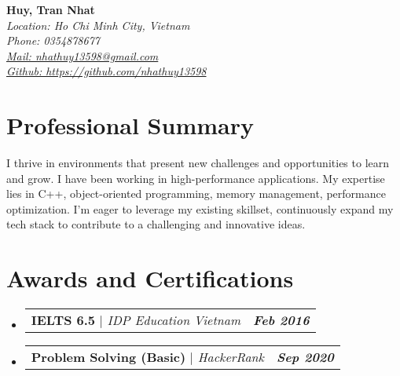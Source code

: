 \documentclass[letterpaper,1pt]{article}
\makeatletter
\newcommand{\sectionspace}{
\vspace{-20pt}
}
\newcommand{\subheadingtitlevspace}{
\vspace{-3pt}
}
\newcommand{\titleItem}[1]{
  \large\textbf{#1}
}
\newcommand{\resumeProjectHeading}[2]{
    \item
    \begin{tabular*}{0.97\textwidth}{l@{\extracolsep{\fill}}r}
      #1 & \textit{\large #2} \\
    \end{tabular*}\vspace{-9pt}
}
\newcommand{\resumeSubHeadingListStart}{\subheadingtitlevspace\begin{itemize}[leftmargin=0.15in, label={}]}
\newcommand{\resumeSubHeadingListEnd}{\end{itemize}}
\makeatother
\begin{document}

\begin{flushleft}
    \textbf{\huge Huy, Tran Nhat} \\    
    \textit{Location: Ho Chi Minh City, Vietnam} \\
    \textit{Phone: 0354878677} \\ 
    \href{mailto:nhathuy13598@gmail.com}{{\textit{Mail: nhathuy13598@gmail.com}}} \\
    \href{https://github.com/nhathuy13598}{{\textit{Github: https://github.com/nhathuy13598}}}
    \vspace{-8pt}
\end{flushleft}



\section{Professional Summary}
\vspace{-3pt}
\begin{itemize}[leftmargin=0.15in, label={}]
    {\item{
     {\large I thrive in environments that present new challenges and opportunities to learn and grow. I have been working in high-performance applications. My expertise lies in C++, object-oriented programming, memory management, performance optimization. I'm eager to leverage my existing skillset, continuously expand my tech stack to contribute to a challenging and innovative ideas.} \\      
    }}
 \end{itemize}
 \sectionspace



\section{Awards and Certifications}
    \resumeSubHeadingListStart
      \resumeProjectHeading
          {\titleItem{IELTS 6.5} \emph{ $|$ IDP Education Vietnam}}{\textbf{Feb 2016}}
      \resumeProjectHeading
          {\titleItem{Problem Solving (Basic)} \emph{ $|$ HackerRank}}{\textbf{Sep 2020}}
    \resumeSubHeadingListEnd
\end{document}
